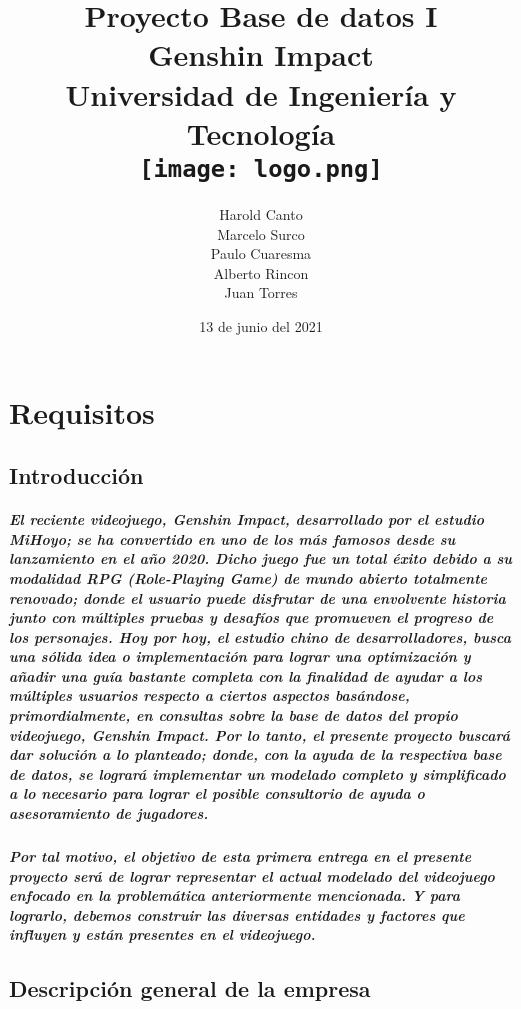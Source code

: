 \documentclass{report}
\title{
{Proyecto Base de datos I\\
Genshin Impact}\\
{\large Universidad de Ingeniería y Tecnología}\\
{\texttt{[image: logo.png]}
}
}
\author{
        Harold Canto\\
        Marcelo Surco\\
        Paulo Cuaresma\\
        Alberto Rincon\\
        Juan Torres  
        }
\date{13 de junio del 2021}
\begin{document}
\maketitle

\tableofcontents

\chapter{Requisitos}
\section{Introducción}
\paragraph{El reciente videojuego, Genshin Impact, desarrollado por el estudio MiHoyo; se ha convertido en uno de los más famosos desde su lanzamiento en el año 2020. Dicho juego fue un total éxito debido a su modalidad RPG (Role-Playing Game) de mundo abierto totalmente renovado; donde el usuario puede disfrutar de una envolvente historia junto con múltiples pruebas y desafíos que promueven el progreso de los personajes. Hoy por hoy, el estudio chino de desarrolladores, busca una sólida idea o implementación para lograr una optimización y añadir una guía bastante completa con la finalidad de ayudar a los múltiples usuarios respecto a ciertos aspectos basándose, primordialmente, en consultas sobre la base de datos del propio videojuego, Genshin Impact. Por lo tanto, el presente proyecto buscará dar solución a lo planteado; donde, con la ayuda de la respectiva base de datos, se logrará implementar un modelado completo y simplificado a lo necesario para lograr el posible consultorio de ayuda o asesoramiento de jugadores. }
\paragraph{Por tal motivo, el objetivo de esta primera entrega en el presente proyecto será de lograr representar el actual modelado del videojuego enfocado en la problemática anteriormente mencionada. Y para lograrlo, debemos construir las diversas entidades y factores que influyen y están presentes en el videojuego.}

\section{Descripción general de la empresa}
\end{document}
